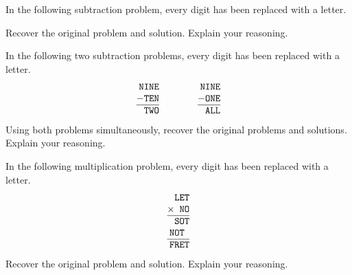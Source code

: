 \documentclass[nooutcomes]{ximera}
\begin{document}
\begin{problem}In the following subtraction problem, every digit has been
  replaced with a letter.
\begin{image}
\end{image}
Recover the original problem and solution. Explain your reasoning.
\end{problem} \begin{problem}In the following two subtraction problems, every digit has been
  replaced with a letter.
\[
\begin{tabular}{@{}r@{}}
\texttt{NINE}\\
$-$\texttt{TEN}\\ \hline
\texttt{TWO}
\end{tabular}
\qquad\qquad
\begin{tabular}{@{}r@{}}
\texttt{NINE}\\
$-$\texttt{ONE}\\ \hline
\texttt{ALL}
\end{tabular}
\]
Using both problems simultaneously, recover the original problems and
solutions. Explain your reasoning.
\end{problem} 

\begin{problem}In the following multiplication problem, every digit has been
  replaced with a letter.
\[
\begin{tabular}{@{}r@{}}
\texttt{LET}\\
$\times$\texttt{ NO}\\ \hline
\texttt{SOT}\\
\texttt{NOT$~$}\\
\hline
\texttt{FRET}
\end{tabular}
\]
Recover the original problem and solution. Explain your reasoning.


\end{problem} 
\end{document}
